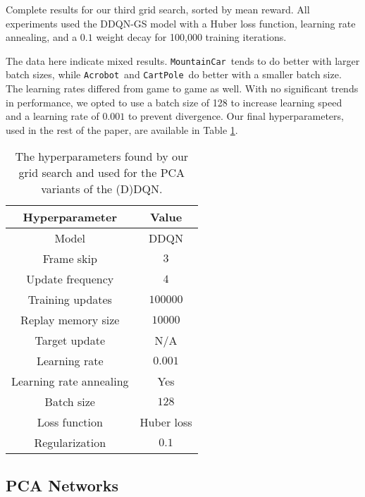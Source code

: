 \documentclass[11pt]{article}
\newcommand{\cp}{\texttt{CartPole}}
\newcommand{\ab}{\texttt{Acrobot}}
\newcommand{\mc}{\texttt{MountainCar}}
\begin{document}
\begin{table}[!ht]
  \centering
  
  
  \caption{Complete results for our third grid search, sorted by mean reward. All experiments used the DDQN-GS model with a Huber loss function, learning rate annealing, and a $0.1$ weight decay for 100,000 training iterations.}
  \label{tab:grid_search_v3_100k}
\end{table}

The data here indicate mixed results. \mc~tends to do better with larger batch sizes, while \ab~and \cp~do better with a smaller batch size. The learning rates differed from game to game as well. With no significant trends in performance, we opted to use a batch size of 128 to increase learning speed and a learning rate of $0.001$ to prevent divergence. Our final hyperparameters, used in the rest of the paper, are available in Table \ref{tab:grid_search_hyperparameters}.

\begin{table}[!ht]
    \centering
    \begin{tabular}{c|c}
        \toprule
        Hyperparameter & Value \\ \midrule
        Model & DDQN \\
        Frame skip & $3$ \\
        Update frequency & $4$ \\
        Training updates & $100000$ \\
        Replay memory size & $10000$ \\
        Target update & N/A \\
        Learning rate & $0.001$ \\
        Learning rate annealing & Yes \\
        Batch size & $128$ \\
        Loss function & Huber loss \\
        Regularization & $0.1$ \\
        \bottomrule
    \end{tabular}
    \caption{The hyperparameters found by our grid search and used for the PCA variants of the (D)DQN.}
    \label{tab:grid_search_hyperparameters}
\end{table}

\subsection{PCA Networks}
\end{document}
